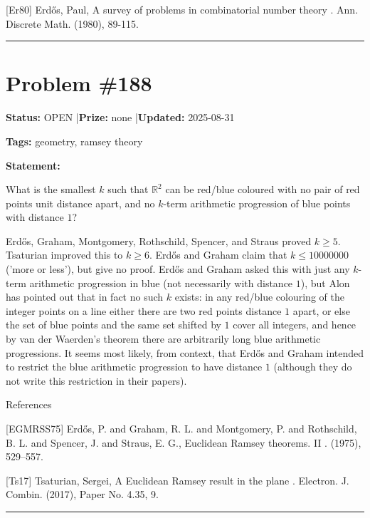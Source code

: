 \documentclass{article}
\begin{document}
[Er80] Erd\H{o}s, Paul, A survey of problems in combinatorial number theory . Ann. Discrete Math. (1980), 89-115.

\noindent\rule{\linewidth}{0.4pt}


\section{Problem \#188}
\label{prob:188}

\noindent\textbf{Status:} OPEN \quad|\quad \textbf{Prize:} none \quad|\quad \textbf{Updated:} 2025-08-31

\noindent\textbf{Tags:} geometry, ramsey theory

\medskip

\noindent\textbf{Statement:}

What is the smallest $k$ such that $\mathbb{R}^2$ can be red/blue coloured with no pair of red points unit distance apart, and no $k$-term arithmetic progression of blue points with distance $1$?




Erd\H{o}s, Graham, Montgomery, Rothschild, Spencer, and Straus \cite{EGMRSS75} proved $k\geq 5$. Tsaturian \cite{Ts17} improved this to $k\geq 6$. Erd\H{o}s and Graham claim that $k\leq 10000000$ ('more or less'), but give no proof. Erd\H{o}s and Graham asked this with just any $k$-term arithmetic progression in blue (not necessarily with distance $1$), but Alon has pointed out that in fact no such $k$ exists: in any red/blue colouring of the integer points on a line either there are two red points distance $1$ apart, or else the set of blue points and the same set shifted by $1$ cover all integers, and hence by van der Waerden's theorem there are arbitrarily long blue arithmetic progressions. It seems most likely, from context, that Erd\H{o}s and Graham intended to restrict the blue arithmetic progression to have distance $1$ (although they do not write this restriction in their papers).




References

[EGMRSS75] Erd\H{o}s, P. and Graham, R. L. and Montgomery, P. and Rothschild, B. L. and Spencer, J. and Straus, E. G., Euclidean {R}amsey theorems. {II} . (1975), 529--557.

[Ts17] Tsaturian, Sergei, A {E}uclidean {R}amsey result in the plane . Electron. J. Combin. (2017), Paper No. 4.35, 9.

\noindent\rule{\linewidth}{0.4pt}
\end{document}
